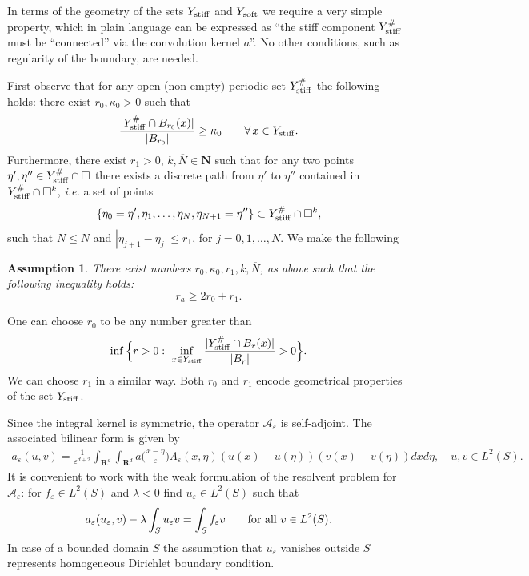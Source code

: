 \documentclass[11pt]{article}
\newcommand\e {\varepsilon}
\newcommand\stiff{{\rm stiff}}
\newcommand\soft{{\rm soft}}
\def\AA{\mathcal{A}}
\newcommand\N{\mathbf{N}}
\newtheorem{assumption}[theorem]{Assumption}
\theoremstyle{remark}
\begin{document}
In terms of the geometry of the sets $Y_\stiff$ and $Y_\soft$ we require a very simple property, which in plain language can be expressed as ``the stiff component $Y_\stiff^\#$ must be ``connected'' via the convolution kernel $a$''. No other conditions, such as regularity of the boundary, are needed. 

First observe that for any open (non-empty) periodic set $Y_\stiff^\#$ the following holds: there exist $r_0, \kappa_0 >0$ such that
\begin{equation*}
	 \frac{|Y^\#_\stiff  \cap B_{r_0}(x)|}{|B_{r_0}|} \geq \kappa_0 \qquad\forall \, x \in Y_\stiff.
\end{equation*}
Furthermore, there exist $r_1>0$, $k, \overline{N}\in \N$ such that    for any two points $\eta', \eta''\in Y^\#_\stiff  \cap \square$ there exists a discrete path from $\eta'$ to $\eta''$ contained in $Y^\#_\stiff \cap \square^k$, \textit{i.e.} a set of points
\begin{equation}\label{8a}
	\{\eta_0=\eta', \eta_1, \dots, \eta_N, \eta_{N+1}=\eta''\} \subset Y^\#_\stiff \cap \square^k,
\end{equation}
such that $N\le \overline{N}$ and 	 $|\eta_{j+1}-\eta_{j}|\leq r_1$, for $j=0,1,\dots, N$.
We make the following

\begin{assumption}\label{assumptionmisja1} 
 There exist numbers $r_0, \kappa_0,r_1, k, \overline{N}$, as above such that the following inequality holds:
 \begin{equation*}%
 	r_a\ge 2r_0+r_1.
 \end{equation*}
\end{assumption}
One can choose $r_0$ to be any number greater than
\begin{equation*}
\inf \Big\{r>0 :\,\, \inf_{ x \in Y_\stiff }	\frac{|Y^\#_\stiff  \cap B_{r}(x)|}{|B_{r}|} > 0\Big\}.
\end{equation*}
We can choose $r_1$ in a similar way. Both $r_0$ and $r_1$ encode geometrical properties of the set $Y_\stiff$.
	
	




Since the integral kernel is symmetric, the operator $\AA_\e$ is self-adjoint. The associated bilinear form is given by %
\begin{eqnarray} \nonumber
	a_\e  (u,v) = \frac{1}{\e^{d+2}} \int_{\mathbf{R}^d}\int_{\mathbf{R}^d} a \Big(\frac{x-\eta }\e \Big) \Lambda_\e  (x,\eta ) (u(x)-u(\eta ))(v(x)-v(\eta ))dx d\eta, \quad u,v \in L^2(S).
\end{eqnarray}
It is convenient to work with the weak formulation of the resolvent problem for $\AA_\e$: for $f_\e  \in L^2(S)$ and  $\lambda<0$ find $u_\e\in L^2(S)$ such that
\begin{eqnarray}\label{starting}
	a_\e(u_\e,v) - \lambda \int_{S} u_\e v =\int_{S} f_\e v \qquad\hbox{for all }v\in L^2(S).
\end{eqnarray}
In case of a bounded domain $S$ the assumption that $u_\e$ vanishes outside $S$ represents homogeneous Dirichlet boundary condition.
\end{document}
